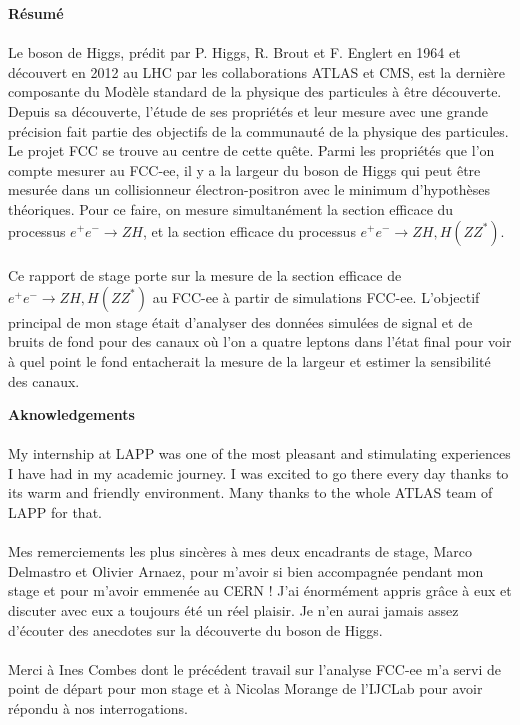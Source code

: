 \documentclass[a4paper,11pt]{article}
\begin{document}
	\noindent
	{\Large\textbf{Résumé}}\\\\
	Le boson de Higgs, prédit par P. Higgs, R. Brout et F. Englert en 1964 et découvert en 2012 au LHC par les collaborations ATLAS et CMS, est la dernière composante du Modèle standard de la physique des particules à être découverte. Depuis sa découverte, l'étude de ses propriétés et leur mesure avec une grande précision fait partie des objectifs de la communauté de la physique des particules. Le projet FCC se trouve au centre de cette quête. Parmi les propriétés que l'on compte mesurer au FCC-ee, il y a la largeur du boson de Higgs qui peut être mesurée dans un collisionneur électron-positron avec le minimum d'hypothèses théoriques. Pour ce faire, on mesure simultanément la section efficace du processus $e^+e^-\rightarrow ZH$, et la section efficace du processus $e^+e^-\rightarrow ZH,H(ZZ^*)$.\\\\
	Ce rapport de stage porte sur la mesure de la section efficace de $e^+e^-\rightarrow ZH,H(ZZ^*)$ au FCC-ee à partir de simulations FCC-ee. L'objectif principal de mon stage était d'analyser des données simulées de signal et de bruits de fond pour des canaux où l'on a quatre leptons dans l'état final pour voir à quel point le fond entacherait la mesure de la largeur et estimer la sensibilité des canaux.
	
	
	\newpage
	\noindent
	{\Large\textbf{Aknowledgements}}\\\\
    My internship at LAPP was one of the most pleasant and stimulating experiences I have had in my academic journey. I was excited to go there every day thanks to its warm and friendly environment. Many thanks to the whole ATLAS team of LAPP for that.\\\\
    Mes remerciements les plus sincères à mes deux encadrants de stage, Marco Delmastro et Olivier Arnaez, pour m'avoir si bien accompagnée pendant mon stage et pour m'avoir emmenée au CERN ! J'ai énormément appris grâce à eux et discuter avec eux a toujours été un réel plaisir. Je n'en aurai jamais assez d'écouter des anecdotes sur la découverte du boson de Higgs.\\\\
    Merci à Ines Combes dont le précédent travail sur l'analyse FCC-ee m'a servi de point de départ pour mon stage et à Nicolas Morange de l'IJCLab pour avoir répondu à nos interrogations.
    
\end{document}
